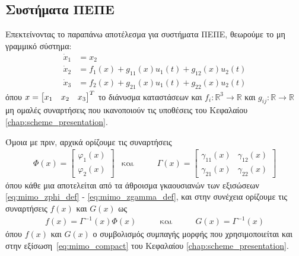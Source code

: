 \subsection{Συστήματα ΠΕΠΕ}
\label{subsec:rbf_mimo}
Επεκτείνοντας το παραπάνω αποτέλεσμα για συστήματα ΠΕΠΕ, θεωρούμε το μη γραμμικό σύστημα:
\begin{equation*}
\label{eq:third_order_plant}
\begin{split}
\dot{x}_1 &= x_{2}  \\
\dot{x}_2 &= f_1(x) + g_{11}(x)u_1(t) + g_{12}(x)u_2(t) \\
\dot{x}_3 &= f_2(x) + g_{21}(x)u_1(t) + g_{22}(x)u_2(t)
\end{split}
\end{equation*}
όπου $x = \bmqty{x_1 & x_2 & x_3}^T$ το διάνυσμα καταστάσεων και $f_i : \mathbb{R}^3 \rightarrow \mathbb{R}$ και $g_{ij}:\mathbb{R} \rightarrow \mathbb{R}$ μη ομαλές συναρτήσεις που ικανοποιούν τις υποθέσεις του Κεφαλαίου \ref{chap:scheme_presentation}.

Όμοια με πριν, αρχικά ορίζουμε τις συναρτήσεις
\begin{equation*}
\begin{matrix}
\Phi(x) =  \begin{bmatrix}
\varphi_1(x) \\
\varphi_2(x)
\end{bmatrix}
& \text{και} \qquad  & \Gamma(x) = \begin{bmatrix}
\gamma_{11}(x) & \gamma_{12}(x) \\
\gamma_{21}(x) & \gamma_{22}(x)
\end{bmatrix}
\end{matrix}
\end{equation*}
όπου κάθε μια αποτελείται από τα άθροισμα γκαουσιανών των εξισώσεων \eqref{eq:mimo_zphi_def} - \eqref{eq:mimo_zgamma_def}, και στην συνέχεια ορίζουμε τις συναρτήσεις $f(x)$ και $G(x)$ ως
\begin{equation*}
\begin{matrix}
f(x) = \Gamma^{-1}(x) \Phi(x) \qquad
& \text{και} \qquad  & G(x) = \Gamma^{-1}(x)
\end{matrix}
\end{equation*}
όπου $f(x)$ και $G(x)$ ο συμβολισμός συμπαγής μορφής που χρησιμοποιείται και στην εξίσωση~\eqref{eq:mimo_compact} του Κεφαλαίου \ref{chap:scheme_presentation}.

